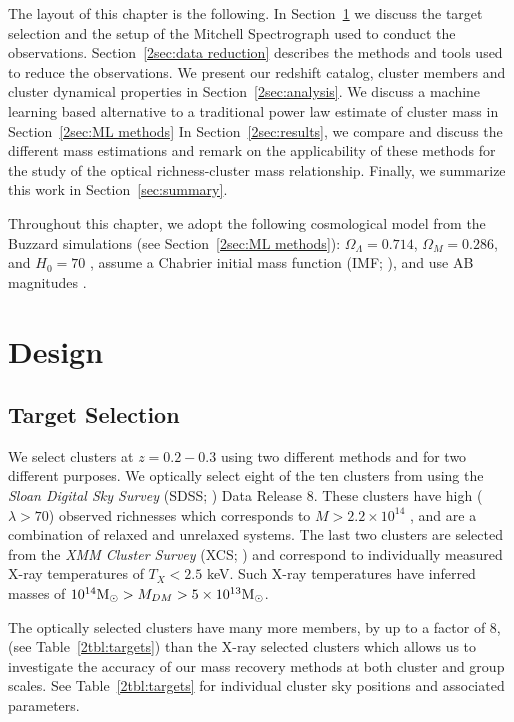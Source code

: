 The layout of this chapter is the following. In Section~\ref{2sec:design} we discuss the target selection and the setup of the Mitchell Spectrograph used to conduct the observations. Section~\ref{2sec:data reduction} describes the methods and tools used to reduce the observations. We present our redshift catalog, cluster members and cluster dynamical properties in Section~\ref{2sec:analysis}. We discuss a machine learning based alternative to a traditional power law estimate of cluster mass in Section~\ref{2sec:ML methods} In Section~\ref{2sec:results}, we compare and discuss the different mass estimations and remark on the applicability of these methods for the study of the optical richness-cluster mass relationship.  Finally, we summarize this work in Section~\ref{sec:summary}.

Throughout this chapter, we adopt the following cosmological model from the Buzzard simulations (see Section~\ref{2sec:ML methods}): $\Omega_\Lambda = 0.714$, $\Omega_M = 0.286$, and $H_0= 70$ \kms \mpc, assume a Chabrier initial mass function (IMF; \citealt{Chabrier2003}), and use AB magnitudes \citep{Oke1974}.

\section{Design}\label{2sec:design} 
\subsection{Target Selection}\label{2sec:selection} 
We select clusters at $z=0.2-0.3$ using two different methods and for two different purposes. We optically select eight of the ten clusters from \cite{Rykoff2012} using the \textit{Sloan Digital Sky Survey} (SDSS; \citealt{Blanton2001a}) Data Release 8. These clusters have high ($\lambda>70$) observed richnesses which corresponds to $M > 2.2\times10^{14}$ \Msol, and are a combination of relaxed and unrelaxed systems. The last two clusters are selected from the \textit{XMM Cluster Survey} (XCS; \citealt{Mehrtens2012}) and correspond to individually measured X-ray temperatures of $T_X < 2.5$ keV. Such X-ray temperatures have inferred masses of $10^{14}\hbox{$\mathrm{M}_\odot$} > M_{DM} > 5\times10^{13}\hbox{$\mathrm{M}_\odot$}$.

The optically selected clusters have many more members, by up to a factor of 8, (see Table~\ref{2tbl:targets}) than the X-ray selected clusters which allows us to investigate the accuracy of our mass recovery methods at both cluster and group scales. See Table~\ref{2tbl:targets} for individual cluster sky positions and associated parameters. 

